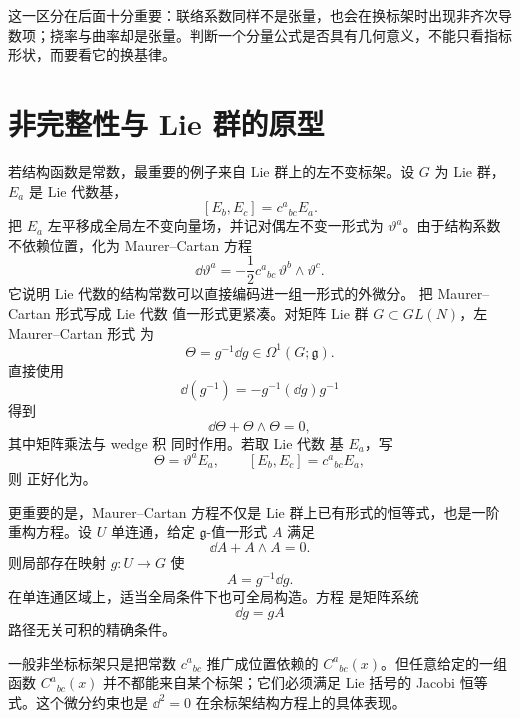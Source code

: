 这一区分在后面十分重要：联络系数同样不是张量，也会在换标架时出现非齐次导数项；挠率与曲率却是张量。判断一个分量公式是否具有几何意义，不能只看指标形状，而要看它的换基律。

\section{非完整性与 Lie 群的原型}
若结构函数是常数，最重要的例子来自 Lie 群上的左不变标架。设 $G$ 为 Lie 群，$E_a$ 是 Lie 代数基，
\[
[E_b,E_c]=c^a{}_{bc}E_a.
\]
把 $E_a$ 左平移成全局左不变向量场，并记对偶左不变一形式为 $\vartheta^a$。由于结构系数不依赖位置，化为 Maurer--Cartan 方程
\begin{equation}\label{eq:math-dg-maurer-cartan}
{
\dd\vartheta^a
=-\frac12c^a{}_{bc}\,\vartheta^b\wedge\vartheta^c.}
\end{equation}
它说明 Lie 代数的结构常数可以直接编码进一组一形式的外微分。
把 Maurer--Cartan 形式写成 Lie 代数 值一形式更紧凑。对矩阵 Lie 群 $G\subset GL(N)$，左 Maurer--Cartan 形式 为
\begin{equation*}\Theta=g^{-1}\dd g\in\Omega^1(G;\mathfrak g).\end{equation*}
直接使用
\[
\dd(g^{-1})=-g^{-1}(\dd g)g^{-1}
\]
得到
\begin{equation}
\dd\Theta+\Theta\wedge\Theta=0,
\label{eq:matrix-maurer-cartan-equation}
\end{equation}
其中矩阵乘法与 wedge 积 同时作用。若取 Lie 代数 基 $E_a$，写
\[
\Theta=\vartheta^aE_a,
\qquad
[E_b,E_c]=c^a{}_{bc}E_a,
\]
则 正好化为。

更重要的是，Maurer--Cartan 方程不仅是 Lie 群上已有形式的恒等式，也是一阶重构方程。设 $U$ 单连通，给定 $\mathfrak g$-值一形式 $A$ 满足
\begin{equation}
\dd A+A\wedge A=0.
\label{eq:mc-flat-integrability}
\end{equation}
则局部存在映射 $g:U\to G$ 使
\begin{equation}
A=g^{-1}\dd g.
\label{eq:mc-pure-gauge}
\end{equation}
在单连通区域上，适当全局条件下也可全局构造。方程 是矩阵系统
\[
\dd g=gA
\]
路径无关可积的精确条件。

一般非坐标标架只是把常数 $c^a{}_{bc}$ 推广成位置依赖的 $C^a{}_{bc}(x)$。但任意给定的一组函数 $C^a{}_{bc}(x)$ 并不都能来自某个标架；它们必须满足 Lie 括号的 Jacobi 恒等式。这个微分约束也是 $\dd^2=0$ 在余标架结构方程上的具体表现。

